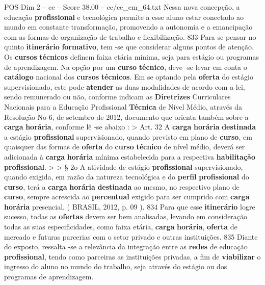 \begin{textsample}{POS Dim 2 – ce – Score 38.00 – ce/ce\_em\_64.txt}
Nessa nova concepção, a educação \textbf{profissional} e tecnológica permite a esse aluno estar conectado ao mundo em constante transformação, promovendo a autonomia e a emancipação com as formas de organização de trabalho e flexibilização. 833 Para se pensar no quinto \textbf{itinerário} \textbf{formativo}, tem -se que considerar alguns pontos de atenção.
Os \textbf{cursos} \textbf{técnicos} definem faixa etária mínima, seja para estágio ou programas de aprendizagem.
Na opção por um \textbf{curso} \textbf{técnico}, deve -se levar em conta o \textbf{catálogo} nacional dos \textbf{cursos} \textbf{técnicos}.
Em se optando pela \textbf{oferta} do estágio supervisionado, este pode \textbf{atender} as duas modalidades de acordo com a lei, sendo remunerado ou não, conforme indicam as \textbf{Diretrizes} Curriculares Nacionais para a Educação Profissional \textbf{Técnica} de Nível Médio, através da Resolução No 6, de setembro de 2012, documento que orienta também sobre a \textbf{carga} \textbf{horária}, conforme lê -se abaixo : > Art. 32 A \textbf{carga} \textbf{horária} \textbf{destinada} a estágio \textbf{profissional} supervisionado, quando previsto em plano de \textbf{curso}, em quaisquer das formas de \textbf{oferta} do \textbf{curso} \textbf{técnico} de nível médio, deverá ser adicionada à \textbf{carga} \textbf{horária} mínima estabelecida para a respectiva \textbf{habilitação} \textbf{profissional}. > > § 2o A atividade de estágio \textbf{profissional} supervisionado, quando exigida, em razão da natureza tecnológica e do \textbf{perfil} \textbf{profissional} do \textbf{curso}, terá a \textbf{carga} \textbf{horária} \textbf{destinada} ao mesmo, no respectivo plano de \textbf{curso}, sempre acrescida ao \textbf{percentual} exigido para ser cumprido com \textbf{carga} \textbf{horária} presencial. ( BRASIL, 2012, p. 09 ). 834 Para que esse \textbf{itinerário} logre sucesso, todas as \textbf{ofertas} devem ser bem analisadas, levando em consideração todas as suas especificidades, como faixa etária, \textbf{carga} \textbf{horária}, \textbf{oferta} de mercado e futuras parcerias com o setor privado e outras instituições. 835 Diante do exposto, ressalta -se a relevância da integração entre as \textbf{redes} de educação \textbf{profissional}, tendo como parceiras as instituições privadas, a fim de \textbf{viabilizar} o ingresso do aluno no mundo do trabalho, seja através do estágio ou dos programas de aprendizagem.

\end{textsample}
